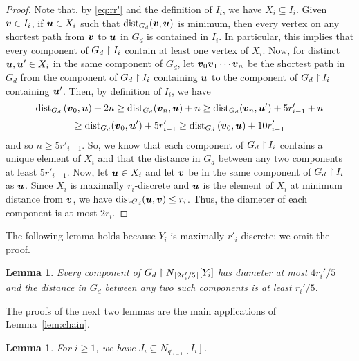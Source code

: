 \documentclass[12pt,a4paper]{amsart}
\numberwithin{equation}{section}
\newtheorem{lemma}[equation]{Lemma}
\theoremstyle{definition}
\begin{document}
\begin{proof}
Note that, by \eqref{eq:rr'} and the definition of $I_i$, we have $X_i\subseteq I_i$. Given $\boldsymbol{v}\in I_i$, if $\boldsymbol{u}\in X_i$ such that $\operatorname{dist}_{G_d}(\boldsymbol{v},\boldsymbol{u})$ is minimum, then every vertex on any shortest path from $\boldsymbol{v}$ to $\boldsymbol{u}$ in $G_d$ is contained in $I_i$. In particular, this implies that every component of $G_d\upharpoonright I_i$ contain at least one vertex of $X_i$. Now, for distinct $\boldsymbol{u},\boldsymbol{u}'\in X_i$ in the same component of $G_d$, let $\boldsymbol{v}_0\boldsymbol{v}_1\cdots \boldsymbol{v}_n$ be the shortest path in $G_d$ from the component of $G_d\upharpoonright I_i$ containing $\boldsymbol{u}$ to the component of $G_d\upharpoonright I_i$ containing $\boldsymbol{u}'$. Then, by definition of $I_i$, we have
\[\operatorname{dist}_{G_d}\left(\boldsymbol{v}_0,\boldsymbol{u}\right)+2n\geq \operatorname{dist}_{G_d}(\boldsymbol{v}_n,\boldsymbol{u})+n\geq\operatorname{dist}_{G_d}(\boldsymbol{v}_n,\boldsymbol{u}')+5r'_{i-1}+n\]
\[\geq \operatorname{dist}_{G_d}(\boldsymbol{v}_0,\boldsymbol{u}')+5 r'_{i-1}\geq \operatorname{dist}_{G_d}\left(\boldsymbol{v}_0,\boldsymbol{u}\right)+10r'_{i-1}\]
and so $n\geq 5r'_{i-1}$. So, we know that each component of $G_d\upharpoonright I_i$ contains a unique element of  $X_i$ and that the distance in $G_d$ between any two components at least $5r'_{i-1}$. Now, let $\boldsymbol{u}\in X_i$ and let $\boldsymbol{v}$ be in the same component of $G_d\upharpoonright I_i$ as $\boldsymbol{u}$. Since $X_i$ is maximally $r_i$-discrete and $\boldsymbol{u}$ is the element of $X_i$ at minimum distance from $\boldsymbol{v}$, we have $\operatorname{dist}_{G_d}(\boldsymbol{u},\boldsymbol{v})\leq r_i$. Thus, the diameter of each component is at most $2r_i$.
\end{proof}

The following lemma holds because $Y_i$ is maximally $r'_i$-discrete; we omit the proof. 


\begin{lemma}
\label{lem:2/5}
Every component of $G_d\upharpoonright N_{\lfloor 2r'_i/5\rfloor}[Y_i]$ has diameter at most $4r_i'/5$ and the distance in $G_d$ between any two such components is at least $r_i'/5$. 
\end{lemma}


The proofs of the next two lemmas are the main applications of Lemma~\ref{lem:chain}. 


\begin{lemma}
\label{lem:Ji}
For $i\geq1$, we have $J_i\subseteq N_{q'_{i-1}}[I_i]$. 
\end{lemma}
\end{document}
